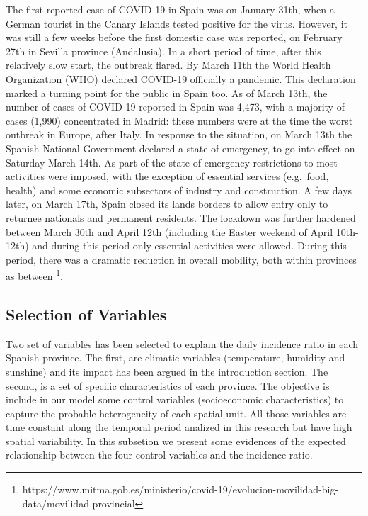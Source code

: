 \documentclass[]{elsarticle} %
\begin{document}
The first reported case of COVID-19 in Spain was on January 31th, when a
German tourist in the Canary Islands tested positive for the virus.
However, it was still a few weeks before the first domestic case was
reported, on February 27th in Sevilla province (Andalusia). In a short
period of time, after this relatively slow start, the outbreak flared.
By March 11th the World Health Organization (WHO) declared COVID-19
officially a pandemic. This declaration marked a turning point for the
public in Spain too. As of March 13th, the number of cases of COVID-19
reported in Spain was 4,473, with a majority of cases (1,990)
concentrated in Madrid: these numbers were at the time the worst
outbreak in Europe, after Italy. In response to the situation, on March
13th the Spanish National Government declared a state of emergency, to
go into effect on Saturday March 14th. As part of the state of emergency
restrictions to most activities were imposed, with the exception of
essential services (e.g.~food, health) and some economic subsectors of
industry and construction. A few days later, on March 17th, Spain closed
its lands borders to allow entry only to returnee nationals and
permanent residents. The lockdown was further hardened between March
30th and April 12th (including the Easter weekend of April 10th-12th)
and during this period only essential activities were allowed. During
this period, there was a dramatic reduction in overall mobility, both
within provinces as between
\footnote{https://www.mitma.gob.es/ministerio/covid-19/evolucion-movilidad-big-data/movilidad-provincial}.

\hypertarget{selection-of-variables}{%
\subsection{Selection of Variables}\label{selection-of-variables}}

Two set of variables has been selected to explain the daily incidence
ratio in each Spanish province. The first, are climatic variables
(temperature, humidity and sunshine) and its impact has been argued in
the introduction section. The second, is a set of specific
characteristics of each province. The objective is include in our model
some control variables (socioeconomic characteristics) to capture the
probable heterogeneity of each spatial unit. All those variables are
time constant along the temporal period analized in this research but
have high spatial variability. In this subsetion we present some
evidences of the expected relationship between the four control
variables and the incidence ratio.
\end{document}
